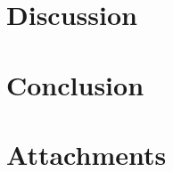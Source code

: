 \documentclass[12pt]{Thesis}
\begin{document}
\chapter{Discussion}

\chapter{Conclusion}

\chapter{Attachments}



\end{document}
